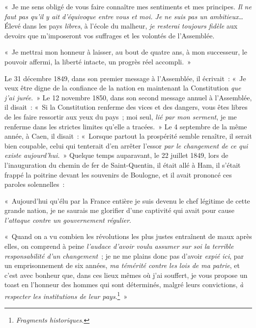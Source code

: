 \documentclass[french,twoside]{book} %
\newenvironment{quoteblock}%
  {\begin{quoting}}
  {\end{quoting}}
\newenvironment{quotebar}{%
    \def\FrameCommand{{\color{rubric!10!}\vrule width 0.5em} \hspace{0.9em}}%
    \def\OuterFrameSep{0pt} %
    \MakeFramed {\advance\hsize-\width \FrameRestore}
  }%
  {%
    \endMakeFramed
  }
\renewenvironment{quoteblock}%
  {%
    \savenotes
    \setstretch{0.9}
    \begin{quotebar}
    \smallskip
  }
  {%
    \smallskip
    \end{quotebar}
    \spewnotes
  }
\begin{document}
\begin{quoteblock}
 \noindent « Je me sens obligé de vous faire connaître mes sentiments et mes principes. \emph{Il ne faut pas qu’il y ait d’équivoque entre vous et moi. Je ne suis pas un ambitieux…} Élevé dans les pays \emph{libres}, à l’école du malheur, \emph{je resterai toujours fidèle} aux devoirs que m’imposeront vos suffrages et les volontés de l’Assemblée.\par
 « Je mettrai mon honneur à laisser, au bout de quatre ans, à mon successeur, le pouvoir affermi, la liberté intacte, un progrès réel accompli. »
 \end{quoteblock}

\noindent Le 31 décembre 1849, dans son premier message à l’Assemblée, il écrivait : « Je veux être digne de la confiance de la nation en maintenant la Constitution \emph{que j’ai jurée}. » Le 12 novembre 1850, dans son second message annuel à l’Assemblée, il disait : « Si la Constitution renferme des vices et des dangers, vous êtes libres de les faire ressortir aux yeux du pays ; moi seul, \emph{lié par mon serment}, je me renferme dans les strictes limites qu’elle a tracées. » Le 4 septembre de la même année, à Caen, il disait : « Lorsque partout la prospérité semble renaître, il serait bien coupable, celui qui tenterait d’en arrêter l’essor \emph{par le changement de ce qui existe aujourd’hui.} » Quelque temps auparavant, le 22 juillet 1849, lors de l’inauguration du chemin de fer de Saint-Quentin, il était allé à Ham, il s’était frappé la poitrine devant les souvenirs de Boulogne, et il avait prononcé ces paroles solennelles :\par

\begin{quoteblock}
 \noindent « Aujourd’hui qu’élu par la France entière je suis devenu le chef légitime de cette grande nation, je ne saurais me glorifier d’une captivité qui avait pour cause \emph{l’attaque contre un gouvernement régulier}.\par
 « Quand on a vu combien les révolutions les plus justes entraînent de maux après elles, on comprend à peine \emph{l’audace d’avoir voulu assumer sur soi la terrible responsabilité d’un changement} ; je ne me plains donc pas d’avoir \emph{expié ici}, par un emprisonnement de six années, \emph{ma témérité contre les lois de ma patrie}, et c’est avec bonheur que, dans ces lieux mêmes où j’ai souffert, je vous propose un toast en l’honneur des hommes qui sont déterminés, malgré leurs convictions, \emph{à respecter les institutions de leur pays}.\footnote{\emph{Fragments historiques.}} »
 \end{quoteblock}
\end{document}
